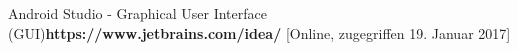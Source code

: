   Android Studio - Graphical User Interface (GUI)\textbf{https://www.jetbrains.com/idea/} [Online, zugegriffen 19. Januar 2017]